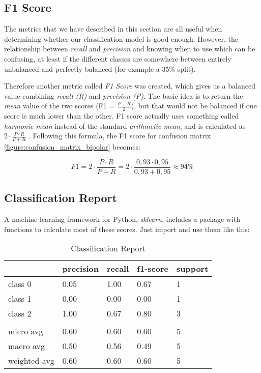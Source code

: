 \subsection{F1 Score}

The metrics that we have described in this section are all useful when determining whether our classification model is good enough. However, the relationship between \textit{recall} and \textit{precision} and knowing when to use which can be confusing, at least if the different classes are somewhere between entirely unbalanced and perfectly balanced (for example a 35\% split). 

Therefore another metric called \textit{F1 Score} was created, which gives us a balanced value combining \textit{recall (R)} and \textit{precision (P)}. The basic idea is to return the \textit{mean} value of the two scores (F1 = $ \frac{P + R}{2} $), but that would not be balanced if one score is much lower than the other. F1 score actually uses something called \textit{harmonic mean} instead of the standard \textit{arithmetic mean}, and is calculated as $ 2 \cdot \frac{P \cdot R}{P + R} $ \cite{ml_metrics}. 
Following this formula, the F1 score for confusion matrix \ref{figure:confusion_matrix_bipolar} becomes:

\[
  F1 = 2 \cdot \frac{P \cdot R}{P + R} = 2 \cdot \frac{0,93 \cdot 0,95}{0,93 + 0,95} \approx 94\%
\]

\subsection{Classification Report}

A machine learning framework for Python, \textit{sklearn}, includes a package with functions to calculate most of these scores. Just import and use them like this: 



\begin{table}
  \begin{tabular}{| l | l | l | l | l |}
    \hline
                  & precision & recall  & f1-score & support \\ \hline
    class 0       & 0.05      & 1.00    & 0.67     & 1       \\
    class 1       & 0.00      & 0.00    & 0.00     & 1       \\
    class 2       & 1.00      & 0.67    & 0.80     & 3       \\
                  &           &         &          &         \\ 
    micro avg     & 0.60      & 0.60    & 0.60     & 5       \\
    macro avg     & 0.50      & 0.56    & 0.49     & 5       \\
    weighted avg  & 0.60      & 0.60    & 0.60     & 5       \\
    \hline
  \end{tabular}
  \caption{Classification Report}
  \label{table:classification_report}
\end{table}

